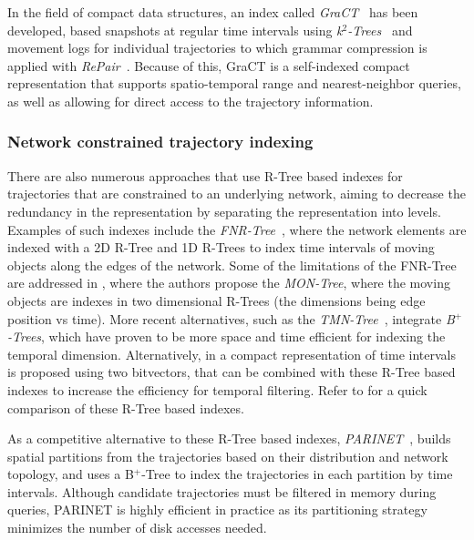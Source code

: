 \documentclass[runningheads]{llncs}
\begin{document}
In the field of compact data structures, an index called {\em GraCT}~\cite{brisaboa2019gract} has been developed, based snapshots at regular time intervals using {\em k$^2$-Trees}~\cite{brisaboa2009k} and movement logs for individual trajectories to which grammar compression is applied with {\em RePair}~\cite{larsson2000off}. Because of this, GraCT is a self-indexed compact representation that supports spatio-temporal range and nearest-neighbor queries, as well as allowing for direct access to the trajectory information.

\subsubsection{Network constrained trajectory indexing}
There are also numerous approaches that use R-Tree based indexes for trajectories that are constrained to an underlying network, aiming to decrease the redundancy in the representation by separating the representation into levels. Examples of such indexes include the {\em FNR-Tree}~\cite{DBLP:conf/ssd/Frentzos03}, where the network elements are indexed with a 2D R-Tree and 1D R-Trees to index time intervals of moving objects along the edges of the network. Some of the limitations of the FNR-Tree are addressed in \cite{DBLP:journals/geoinformatica/AlmeidaG05}, where the authors propose the {\em MON-Tree}, where the moving objects are indexes in two dimensional R-Trees (the dimensions being edge position vs time). More recent alternatives, such as the {\em TMN-Tree}~\cite{chang2010tmn}, integrate {\em B$^+$-Trees}, which have proven to be more space and time efficient for indexing the temporal dimension. Alternatively, in \cite{rivera2018faster} a compact representation of time intervals is proposed using two bitvectors, that can be combined with these R-Tree based indexes to increase the efficiency for temporal filtering. Refer to \cite{john2017performance} for a quick comparison of these R-Tree based indexes.

As a competitive alternative to these R-Tree based indexes, {\em PARINET}~\cite{DBLP:journals/vldb/PopaZOBV11}, builds spatial partitions from the trajectories based on their distribution and network topology, and uses a B$^+$-Tree to index the trajectories in each partition by time intervals. Although candidate trajectories must be filtered in memory during queries, PARINET is highly efficient in practice as its partitioning strategy minimizes the number of disk accesses needed.
\end{document}
